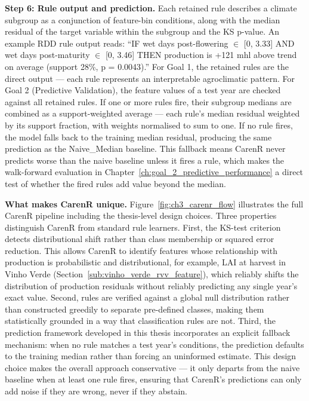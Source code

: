 \textbf{Step 6: Rule output and prediction. }Each retained rule describes a climate subgroup as a conjunction of feature-bin conditions, along with the median residual of the target variable within the subgroup and the KS p-value. An example RDD rule output reads: ``IF wet days post-flowering $\in$ [0, 3.33] AND wet days post-maturity $\in$ [0, 3.46] THEN production is +121 mhl above trend on average (support 28\%, p = 0.0043).'' For Goal 1, the retained rules are the direct output --- each rule represents an interpretable agroclimatic pattern. For Goal 2 (Predictive Validation), the feature values of a test year are checked against all retained rules. If one or more rules fire, their subgroup medians are combined as a support-weighted average --- each rule's median residual weighted by its support fraction, with weights normalised to sum to one. If no rule fires, the model falls back to the training median residual, producing the same prediction as the Naive\_Median baseline. This fallback means CarenR never predicts worse than the naive baseline unless it fires a rule, which makes the walk-forward evaluation in Chapter~\ref{ch:goal_2_predictive_performance} a direct test of whether the fired rules add value beyond the median.

\textbf{What makes CarenR unique. }Figure~\ref{fig:ch3_carenr_flow} illustrates the full CarenR pipeline including the thesis-level design choices. Three properties distinguish CarenR from standard rule learners. First, the KS-test criterion detects distributional shift rather than class membership or squared error reduction. This allows CarenR to identify features whose relationship with production is probabilistic and distributional, for example, LAI at harvest in Vinho Verde (Section~\ref{sub:vinho_verde_rvv_feature}), which reliably shifts the distribution of production residuals without reliably predicting any single year's exact value. Second, rules are verified against a global null distribution rather than constructed greedily to separate pre-defined classes, making them statistically grounded in a way that classification rules are not. Third, the prediction framework developed in this thesis incorporates an explicit fallback mechanism: when no rule matches a test year's conditions, the prediction defaults to the training median rather than forcing an uninformed estimate. This design choice makes the overall approach conservative --- it only departs from the naive baseline when at least one rule fires, ensuring that CarenR's predictions can only add noise if they are wrong, never if they abstain.


